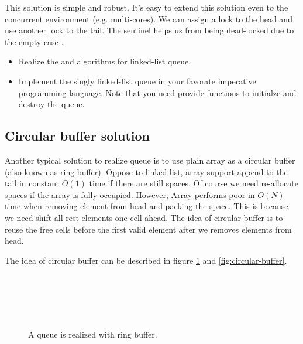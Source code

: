 \documentclass{article}
\begin{document}
This solution is simple and robust. It's easy to extend this solution 
even to the concurrent environment (e.g. multi-cores). We can assign
a lock to the head and use another lock to the tail. The sentinel 
helps us from being dead-locked due to the empty case \cite{PODC96} \cite{SutterDDJ}.

\begin{Exercise}
\begin{itemize}
\item Realize the  and  algorithms
for linked-list queue.

\item Implement the singly linked-list queue in your favorate imperative 
programming language. Note that you need provide functions to initialze
and destroy the queue.
\end{itemize}
\end{Exercise}

\subsection{Circular buffer solution}

Another typical solution to realize queue is to use plain array as
a circular buffer (also known as ring buffer). 
Oppose to linked-list, array support append to the 
tail in constant $O(1)$ time if there are still spaces. Of course
we need re-allocate spaces if the array is fully occupied. However,
Array performs poor in $O(N)$ time when removing element from head
and packing the space. This is because we need shift all rest elements
one cell ahead. The idea of circular buffer is to reuse the free
cells before the first valid element after we removes elements from
head.

The idea of circular buffer can be described in figure \ref{fig:circular-buffer-queue}
and \ref{fig:circular-buffer}.

\begin{figure}[htbp]
 \centering
  \\
  \\
  \\
  \\
 \caption{A queue is realized with ring buffer.} \label{fig:circular-buffer-queue}
\end{figure}
\end{document}

